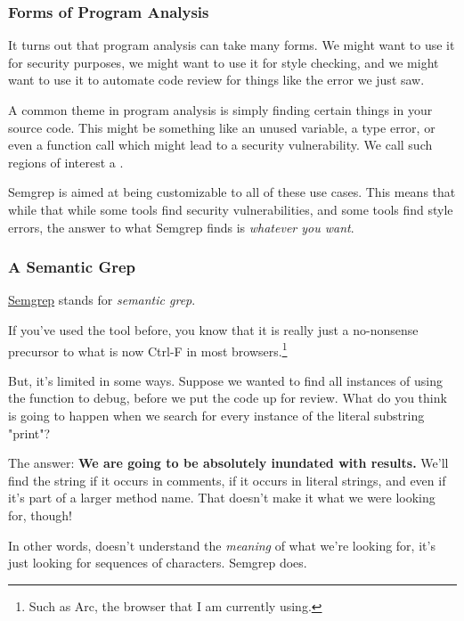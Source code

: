 \documentclass[aspectratio=169, handout]{beamer}
\begin{document}
 \begin{frame}[fragile]
   \frametitle{Forms of Program Analysis}

   It turns out that program analysis can take many forms. We might want to use
   it for security purposes, we might want to use it for style checking, and we
   might want to use it to automate code review for things like the error we just
   saw.

   \pause
   \vspace{\fill}

   A common theme in program analysis is simply finding certain things in your
   source code. This might be something like an unused variable, a type error,
   or even a function call which might lead to a security vulnerability. We
   call such regions of interest a .

   \pause
   \vspace{\fill}

   Semgrep is aimed at being customizable to all of these use cases. This means
   that while that while some tools find security vulnerabilities, and some
   tools find style errors, the answer to what Semgrep finds is \textit{whatever
   you want}.
 \end{frame}

 \begin{frame}[fragile]
   \frametitle{A Semantic Grep}

   {\color{blue}\href{https://semgrep.dev/}{Semgrep}} stands for \textit{semantic grep}.

   \pause
   \vspace{\fill}

   If you've used the tool  before, you know that it is really just a
   no-nonsense precursor to what is now Ctrl-F in most browsers.\footnote{Such as Arc,
   the browser that I am currently using.}

   \pause
   \vspace{\fill}

   But, it's limited in some ways. Suppose we wanted to find all instances of
   using the function  to debug, before we put the code up for
   review. What do you think is going to happen when we search for every instance
   of the literal substring "print"?

   \pause
   \vspace{\fill}

   The answer: \textbf{We are going to be absolutely inundated with results.} We'll
   find the string  if it occurs in comments, if it occurs in literal
   strings, and even if it's part of a larger method name. That doesn't make it what
   we were looking for, though!

   \pause
   \vspace{\fill}

   In other words,  doesn't understand the \textit{meaning} of what we're
   looking for, it's just looking for sequences of characters. Semgrep does.
 \end{frame}
\end{document}
